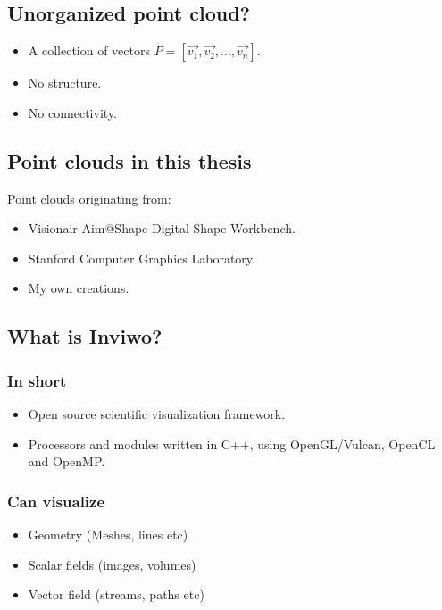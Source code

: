 \documentclass[11pt]{article}
\begin{document}
\subsection*{Unorganized point cloud?}
\label{sec:org2506e07}
\begin{itemize}
\item A collection of vectors \(P = [\vec{v_1},\vec{v_2},...,\vec{v_n}]\).
\item No structure.
\item No connectivity.
\end{itemize}

\subsection*{Point clouds in this thesis}
\label{sec:orgaa47012}
Point clouds originating from:
\begin{itemize}
\item Visionair Aim@Shape Digital Shape Workbench.
\item Stanford Computer Graphics Laboratory.
\item My own creations.
\end{itemize}


\subsection*{What is Inviwo?}
\label{sec:org11da038}
\subsubsection*{In short}
\label{sec:orgdd1dc7b}
\begin{itemize}
\item Open source scientific visualization framework.
\item Processors and modules written in C++, using OpenGL/Vulcan, OpenCL and OpenMP.
\end{itemize}
\subsubsection*{Can visualize}
\label{sec:orge60aa04}
\begin{itemize}
\item Geometry (Meshes, lines etc)
\item Scalar fields (images, volumes)
\item Vector field (streams, paths etc)
\end{itemize}
\end{document}
